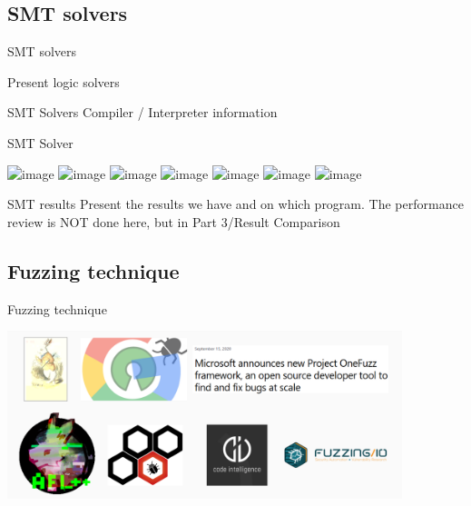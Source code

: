\documentclass{beamer}
\begin{document}
\subsection{SMT solvers}

\begin{frame}{SMT solvers}

Present logic solvers

\end{frame}

\begin{frame}{SMT Solvers}
Compiler / Interpreter information
\end{frame}

\begin{frame}{SMT Solver}

\includegraphics<1>[width=9cm]{Figures/SMTsolver/1.png}
\includegraphics<2>[width=9cm]{Figures/SMTsolver/2.png}
\includegraphics<3>[width=9cm]{Figures/SMTsolver/3.png}
\includegraphics<4>[width=9cm]{Figures/SMTsolver/4.png}
\includegraphics<5>[width=9cm]{Figures/SMTsolver/5.png}
\includegraphics<6>[width=9cm]{Figures/SMTsolver/6.png}
\includegraphics<7>[width=9cm]{Figures/SMTsolver/7.png}

\end{frame}

\begin{frame}{SMT results}
Present the results we have and on which program. The performance review is NOT done here, but in Part 3/Result Comparison
\end{frame}

\subsection{Fuzzing technique}

\begin{frame}{Fuzzing technique}

\includegraphics[width=11.5cm]{Figures/Fuzzing/graph1.png}

\end{frame}
\end{document}
